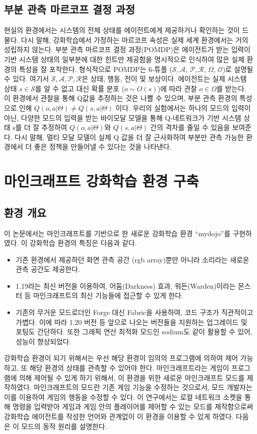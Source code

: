 \documentclass[oneside, under, ko]{snuthesis}
\begin{document}
\section{부분 관측 마르코프 결정 과정 \cite{POMDP}} 
현실의 환경에서는 시스템의 전체 상태를 에이전트에게 제공하거나 확인하는 것이 드물다. 다시 말해, 강화학습에서 가정하는 마르코프 속성은 실제 세계 환경에서는 거의 성립하지 않는다. 부분 관측 마르코프 결정 과정(POMDP)은 에이전트가 받는 입력이 기반 시스템 상태의 일부분에 대한 힌트만 제공함을 명시적으로 인식하여 많은 실제 환경의 특성을 잘 포착한다. 형식적으로 POMDP는 6-튜플 ($\mathcal{S}, \mathcal{A}$, $\mathcal{P}, \mathcal{R}$, $\Omega$, $\mathcal{O}$)로 설명될 수 있다. 여기서 $\mathcal{S}, \mathcal{A}, \mathcal{P}, \mathcal{R}$은 상태, 행동, 전이 및 보상이다. 에이전트는 실제 시스템 상태 $s \in \mathcal{S}$를 알 수 없고 대신 확률 분포 ($o \sim O(s)$)에 따라 관찰 $o \in \Omega$를 받는다. 이 환경에서 관찰을 통해 Q값을 추정하는 것은 나쁠 수 있으며, 부분 관측 환경의 특성으로 인해 $Q(o, a|\Theta) \neq Q(s, a|\Theta)$ 이다. 우리의 실험에서는 하나의 모드의 입력이 아닌, 다양한 모드의 입력을 받는 바이모달 모델을 통해 Q-네트워크가 기반 시스템 상태 s를 더 잘 추정하여 $Q(o, a|\Theta)$와 $Q(s, a|\Theta)$ 간의 격차를 줄일 수 있음을 보여준다. 다시 말해, 멀티 모달 모델이 실제 Q 값을 더 잘 근사화하여 부분만 관측 가능한 환경에서 더 좋은 정책을 만들어낼 수 있다는 것을 나타낸다.

\chapter{마인크래프트 강화학습 환경 구축}
\section{환경 개요}
이 논문에서는 마인크래프트를 기반으로 한 새로운 강화학습 환경 “mydojo”를 구현하였다. 이 강화학습 환경의 특징은 다음과 같다.
\begin{itemize}
    \item 기존 환경에서 제공하던 화면 관측 공간 (rgb array)뿐만 아니라 소리라는 새로운 관측 공간도 제공한다.
    \item 1.19라는 최신 버전을 이용하여, 어둠(Darkness) 효과, 워든(Warden)이라는 몬스터 등 마인크래프트의 최신 기능들에 접근할 수 있게 한다.
    \item 기존의 무거운 모드로더인 Forge 대신 Fabric을 사용하여, 코드 구조가 직관적이고 가볍다. 이에 따라 1.20 버전 등 앞으로 나오는 버전들을 지원하는 업그레이드 및 포팅도 간단하다. 또한 그래픽 연산 최적화 모드인 sodium도 같이 활용할 수 있어, 성능이 향상되었다.
\end{itemize}
강화학습 환경이 되기 위해서는 우선 해당 환경이 임의의 프로그램에 의하여 제어 가능하고, 또 해당 환경의 상태를 관측할 수 있어야 한다. 마인크래프트라는 게임이 프로그램에 의해 제어될 수 있게 하기 위해서, 이 환경을 위한 새로운 마인크래프트 모드를 제작하였다. 마인크래프트의 모드란 기존 게임 기능을 수정하는 것으로서, 모드 개발자는 이를 이용하여 게임의 행동을 수정할 수 있다. 이 연구에서는 로컬 네트워크 소켓을 통해 명령을 입력받아 게임과 게임 안의 플레이어를 제어할 수 있는 모드를 제작함으로써 강화학습 에이전트를 작성한 언어와 관계없이 이 환경을 이용할 수 있게 하였다.
다음은 이 모드의 동작 원리를 설명한다.
\end{document}
